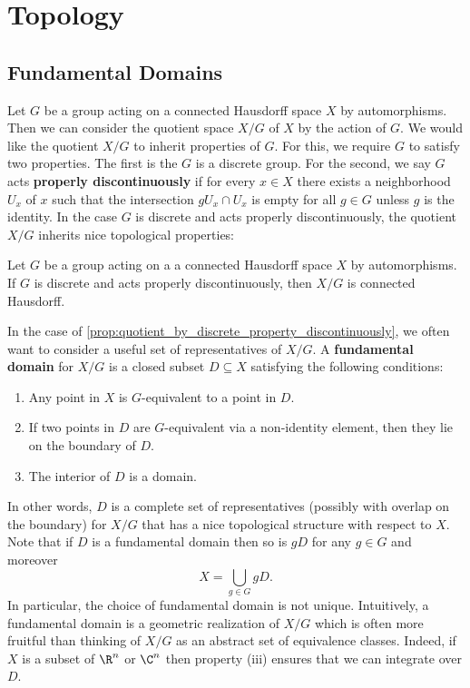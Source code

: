 \chapter{Topology}
  \section{Fundamental Domains}\label{append:Fundamental_Domains}
    Let $G$ be a group acting on a connected Hausdorff space $X$ by automorphisms. Then we can consider the quotient space $X/G$ of $X$ by the action of $G$. We would like the quotient $X/G$ to inherit properties of $G$. For this, we require $G$ to satisfy two properties. The first is the $G$ is a discrete group. For the second, we say $G$ acts \textbf{properly discontinuously} if for every $x \in X$ there exists a neighborhood $U_{x}$ of $x$ such that the intersection $gU_{x} \cap U_{x}$ is empty for all $g \in G$ unless $g$ is the identity. In the case $G$ is discrete and acts properly discontinuously, the quotient $X/G$ inherits nice topological properties:

    \begin{proposition}\label{prop:quotient_by_discrete_property_discontinuously}
      Let $G$ be a group acting on a a connected Hausdorff space $X$ by automorphisms. If $G$ is discrete and acts properly discontinuously, then $X/G$ is connected Hausdorff.
    \end{proposition}

    In the case of \cref{prop:quotient_by_discrete_property_discontinuously}, we often want to consider a useful set of representatives of $X/G$. A \textbf{fundamental domain} for $X/G$ is a closed subset $D \subseteq X$ satisfying the following conditions:
      \begin{enumerate}[label=(\roman*)]
        \item Any point in $X$ is $G$-equivalent to a point in $D$.
        \item If two points in $D$ are $G$-equivalent via a non-identity element, then they lie on the boundary of $D$.
        \item The interior of $D$ is a domain.
      \end{enumerate}
      In other words, $D$ is a complete set of representatives (possibly with overlap on the boundary) for $X/G$ that has a nice topological structure with respect to $X$. Note that if $D$ is a fundamental domain then so is $gD$ for any $g \in G$ and moreover
      \[
        X = \bigcup_{g \in G}gD.
      \]
      In particular, the choice of fundamental domain is not unique. Intuitively, a fundamental domain is a geometric realization of $X/G$ which is often more fruitful than thinking of $X/G$ as an abstract set of equivalence classes. Indeed, if $X$ is a subset of $\R^{n}$ or $\C^{n}$ then property (iii) ensures that we can integrate over $D$.
